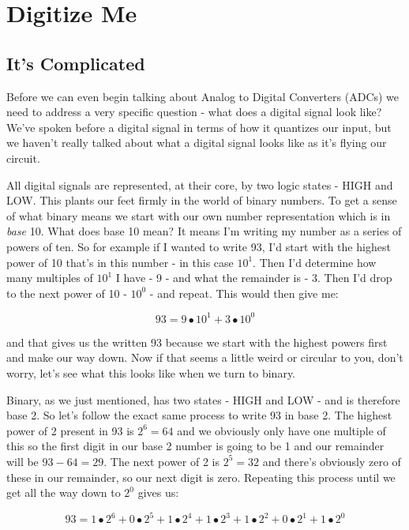 \documentclass[10pt,a5paper]{book}
\begin{document}
\chapter{Digitize Me}
\section{It's Complicated}
Before we can even begin talking about Analog to Digital Converters (ADCs) we need to address a very specific question - what does a digital signal look like? We've spoken before a digital signal in terms of how it quantizes our input, but we haven't really talked about what a digital signal looks like as it's flying our circuit. 

All digital signals are represented, at their core, by two logic states - HIGH and LOW. This plants our feet firmly in the world of binary numbers. To get a sense of what binary means we start with our own number representation which is in \textit{base} 10. What does base 10 mean? It means I'm writing my number as a series of powers of ten. So for example if I wanted to write 93, I'd start with the highest power of 10 that's in this number - in this case $10^1$. Then I'd determine how many multiples of $10^1$ I have - 9 - and what the remainder is - 3. Then I'd drop to the next power of 10 - $10^0$ - and repeat. This would then give me:

\begin{equation}
93 = 9 \bullet 10^1 + 3 \bullet 10^0
\end{equation}

and that gives us the written 93 because we start with the highest powers first and make our way down. Now if that seems a little weird or circular to you, don't worry, let's see what this looks like when we turn to binary. 

Binary, as we just mentioned, has two states - HIGH and LOW - and is therefore base 2. So let's follow the exact same process to write 93 in base 2. The highest power of 2 present in 93 is $2^6=64$ and we obviously only have one multiple of this so the first digit in our base 2 number is going to be 1 and our remainder will be $93 - 64=29$. The next power of 2 is $2^5=32$ and there's obviously zero of these in our remainder, so our next digit is zero. Repeating this process until we get all the way down to $2^0$ gives us:

\begin{equation}
93 = 1 \bullet 2^6 + 0 \bullet 2^5 + 1 \bullet 2 ^ 4 + 1 \bullet 2 ^ 3 + 1 \bullet 2 ^ 2 + 0 \bullet 2 ^ 1 + 1 \bullet 2 ^ 0
\end{equation}
\end{document}
